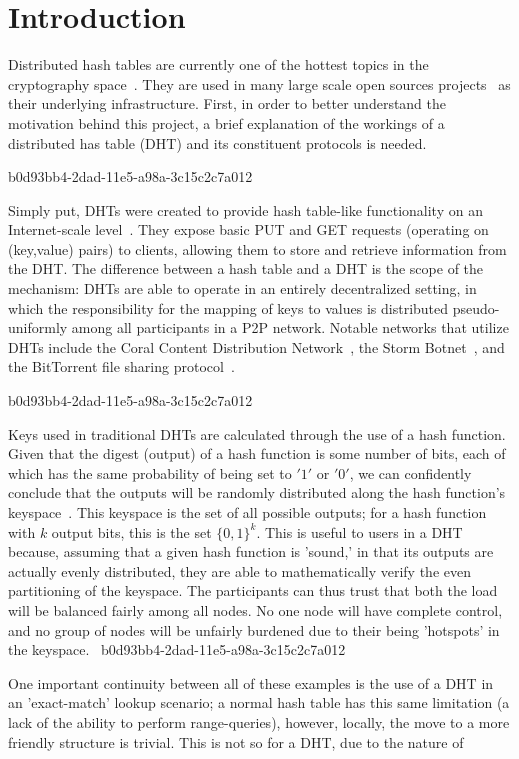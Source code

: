 \documentclass[12pt]{article}
\begin{document}
\section{Introduction}
\par Distributed hash tables are currently one of the hottest topics in the cryptography space~\cite{Stoica:2001dj,Rowstron:2001ea,Ratnasamy:2001wn}. They are used in many large scale open sources projects~\cite{Freitas:2013tb,Xu:2010vs,Perfitt:2010fh} as their underlying infrastructure. First, in order to better understand the motivation behind this project, a brief explanation of the workings of a distributed has table (DHT) and its constituent protocols is needed.

b0d93bb4-2dad-11e5-a98a-3c15c2c7a012\par Simply put, DHTs were created to provide hash table-like functionality on an Internet-scale level~\cite{Ratnasamy:2001wn}. They expose basic PUT and GET requests (operating on (key,value) pairs) to clients, allowing them to store and retrieve information from the DHT. The difference between a hash table and a DHT is the scope of the mechanism: DHTs are able to operate in an entirely decentralized setting, in which the responsibility for the mapping of keys to values is distributed pseudo-uniformly among all participants in a P2P network. Notable networks that utilize DHTs include the Coral Content Distribution Network~\cite{Freedman:2004vb}, the Storm Botnet~\cite{Holz:2008uk}, and the BitTorrent file sharing protocol~\cite{Cohen:y1_8mBnw}.

b0d93bb4-2dad-11e5-a98a-3c15c2c7a012\par Keys used in traditional DHTs are calculated through the use of a hash function. Given that the digest (output) of a hash function is some number of bits, each of which has the same probability of being set to $'1'$ or $'0'$, we can confidently conclude that the outputs will be randomly distributed along the hash function's keyspace~. This keyspace is the set of all possible outputs; for a hash function with $k$ output bits, this is the set $\{0,1\}^k$. This is useful to users in a DHT because, assuming that a given hash function is 'sound,' in that its outputs are actually evenly distributed, they are able to mathematically verify the even partitioning of the keyspace. The participants can thus trust that both the load will be balanced fairly among all nodes. No one node will have complete control, and no group of nodes will be unfairly burdened due to their being 'hotspots' in the keyspace.~
b0d93bb4-2dad-11e5-a98a-3c15c2c7a012
\par One important continuity between all of these examples is the use of a DHT in an 'exact-match' lookup scenario; a normal hash table has this same limitation (a lack of the ability to perform range-queries), however, locally, the move to a more friendly structure is trivial. This is not so for a DHT, due to the nature of
\printbibliography
\end{document}
